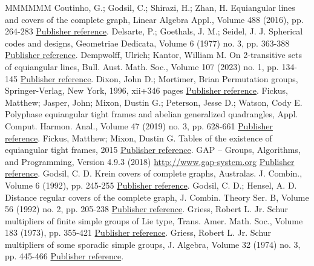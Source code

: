 \documentclass[11pt]{article}
\theoremstyle{definition}
\numberwithin{equation}{section}
\begin{document}
\begin{thebibliography}{MMMMMM}
 Coutinho, G.; Godsil, C.; Shirazi, H.; Zhan, H. Equiangular lines and covers of the complete graph, Linear Algebra Appl., Volume 488 (2016), pp. 264-283 \href{https://alco.centre-mersenne.org/articles/10.5802/alco.324/#CoutinhoGSZ:16}{Publisher reference}.
 Delsarte, P.; Goethals, J. M.; Seidel, J. J. Spherical codes and designs, Geometriae Dedicata, Volume 6 (1977) no. 3, pp. 363-388 \href{https://alco.centre-mersenne.org/articles/10.5802/alco.324/#DelsarteGS:77}{Publisher reference}.
 Dempwolff, Ulrich; Kantor, William M. On 2-transitive sets of equiangular lines, Bull. Aust. Math. Soc., Volume 107 (2023) no. 1, pp. 134-145 \href{https://alco.centre-mersenne.org/articles/10.5802/alco.324/#DempwolffK:23}{Publisher reference}.
 Dixon, John D.; Mortimer, Brian Permutation groups, Springer-Verlag, New York, 1996, xii+346 pages \href{https://alco.centre-mersenne.org/articles/10.5802/alco.324/#DixonMortimer:96}{Publisher reference}.
 Fickus, Matthew; Jasper, John; Mixon, Dustin G.; Peterson, Jesse D.; Watson, Cody E. Polyphase equiangular tight frames and abelian generalized quadrangles, Appl. Comput. Harmon. Anal., Volume 47 (2019) no. 3, pp. 628-661 \href{https://alco.centre-mersenne.org/articles/10.5802/alco.324/#FickusJMPW:17}{Publisher reference}.
 Fickus, Matthew; Mixon, Dustin G. Tables of the existence of equiangular tight frames, 2015 \href{https://alco.centre-mersenne.org/articles/10.5802/alco.324/#FickusMixon:table}{Publisher reference}.
 GAP – Groups, Algorithms, and Programming, Version 4.9.3 (2018) \url{http://www.gap-system.org} \href{https://alco.centre-mersenne.org/articles/10.5802/alco.324/#GAP}{Publisher reference}.
 Godsil, C. D. Krein covers of complete graphs, Australas. J. Combin., Volume 6 (1992), pp. 245-255 \href{https://alco.centre-mersenne.org/articles/10.5802/alco.324/#Godsil:92}{Publisher reference}.
 Godsil, C. D.; Hensel, A. D. Distance regular covers of the complete graph, J. Combin. Theory Ser. B, Volume 56 (1992) no. 2, pp. 205-238 \href{https://alco.centre-mersenne.org/articles/10.5802/alco.324/#GodsilHensel:92}{Publisher reference}.
 Griess, Robert L. Jr. Schur multipliers of finite simple groups of Lie type, Trans. Amer. Math. Soc., Volume 183 (1973), pp. 355-421 \href{https://alco.centre-mersenne.org/articles/10.5802/alco.324/#Griess:73}{Publisher reference}.
 Griess, Robert L. Jr. Schur multipliers of some sporadic simple groups, J. Algebra, Volume 32 (1974) no. 3, pp. 445-466 \href{https://alco.centre-mersenne.org/articles/10.5802/alco.324/#Griess:74}{Publisher reference}.

\end{thebibliography}
\end{document}

